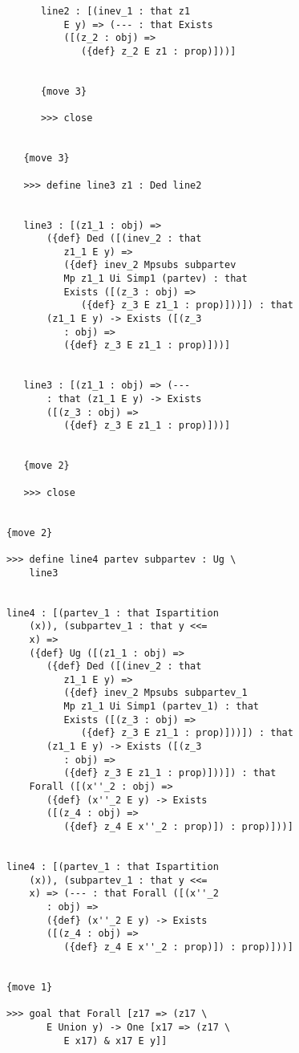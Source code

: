 \documentclass[12pt]{article}
\begin{document}
\begin{verbatim}
            line2 : [(inev_1 : that z1 
                E y) => (--- : that Exists 
                ([(z_2 : obj) => 
                   ({def} z_2 E z1 : prop)]))]


            {move 3}

            >>> close


         {move 3}

         >>> define line3 z1 : Ded line2


         line3 : [(z1_1 : obj) => 
             ({def} Ded ([(inev_2 : that 
                z1_1 E y) => 
                ({def} inev_2 Mpsubs subpartev 
                Mp z1_1 Ui Simp1 (partev) : that 
                Exists ([(z_3 : obj) => 
                   ({def} z_3 E z1_1 : prop)]))]) : that 
             (z1_1 E y) -> Exists ([(z_3 
                : obj) => 
                ({def} z_3 E z1_1 : prop)]))]


         line3 : [(z1_1 : obj) => (--- 
             : that (z1_1 E y) -> Exists 
             ([(z_3 : obj) => 
                ({def} z_3 E z1_1 : prop)]))]


         {move 2}

         >>> close


      {move 2}

      >>> define line4 partev subpartev : Ug \
          line3


      line4 : [(partev_1 : that Ispartition 
          (x)), (subpartev_1 : that y <<= 
          x) => 
          ({def} Ug ([(z1_1 : obj) => 
             ({def} Ded ([(inev_2 : that 
                z1_1 E y) => 
                ({def} inev_2 Mpsubs subpartev_1 
                Mp z1_1 Ui Simp1 (partev_1) : that 
                Exists ([(z_3 : obj) => 
                   ({def} z_3 E z1_1 : prop)]))]) : that 
             (z1_1 E y) -> Exists ([(z_3 
                : obj) => 
                ({def} z_3 E z1_1 : prop)]))]) : that 
          Forall ([(x''_2 : obj) => 
             ({def} (x''_2 E y) -> Exists 
             ([(z_4 : obj) => 
                ({def} z_4 E x''_2 : prop)]) : prop)]))]


      line4 : [(partev_1 : that Ispartition 
          (x)), (subpartev_1 : that y <<= 
          x) => (--- : that Forall ([(x''_2 
             : obj) => 
             ({def} (x''_2 E y) -> Exists 
             ([(z_4 : obj) => 
                ({def} z_4 E x''_2 : prop)]) : prop)]))]


      {move 1}

      >>> goal that Forall [z17 => (z17 \
             E Union y) -> One [x17 => (z17 \
                E x17) & x17 E y]]


\end{verbatim}
\end{document}
